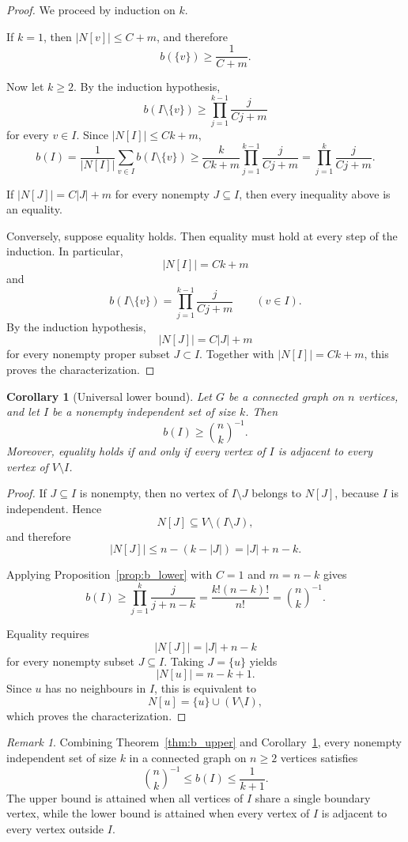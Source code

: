 \documentclass[11pt,a4paper]{article}
\numberwithin{equation}{section}
\theoremstyle{plain}
\newtheorem{corollary}[theorem]{Corollary}
\theoremstyle{definition}
\theoremstyle{remark}
\newtheorem{remark}[theorem]{Remark}
\begin{document}
\begin{proof}
We proceed by induction on \(k\).

If \(k=1\), then \(|N[v]|\le C+m\), and therefore
\[
b(\{v\})\ge \frac1{C+m}.
\]

Now let \(k\ge2\). By the induction hypothesis,
\[
b(I\setminus\{v\})
\ge
\prod_{j=1}^{k-1}
\frac{j}{Cj+m}
\]
for every \(v\in I\). Since \(|N[I]|\le Ck+m\),
\[
b(I)
=
\frac1{|N[I]|}
\sum_{v\in I} b(I\setminus\{v\})
\ge
\frac{k}{Ck+m}
\prod_{j=1}^{k-1}
\frac{j}{Cj+m}
=
\prod_{j=1}^{k}
\frac{j}{Cj+m}.
\]

If \(|N[J]|=C|J|+m\) for every nonempty \(J\subseteq I\), then every inequality above is an equality.

Conversely, suppose equality holds. Then equality must hold at every step of the induction. In particular,
\[
|N[I]|=Ck+m
\]
and
\[
b(I\setminus\{v\})
=
\prod_{j=1}^{k-1}
\frac{j}{Cj+m}
\qquad
(v\in I).
\]
By the induction hypothesis,
\[
|N[J]|=C|J|+m
\]
for every nonempty proper subset \(J\subset I\). Together with \(|N[I]|=Ck+m\), this proves the characterization.
\end{proof}

\begin{corollary}[Universal lower bound]
\label{cor:b_universal_lower}
Let \(G\) be a connected graph on \(n\) vertices, and let \(I\) be a nonempty independent set of size \(k\). Then
\[
b(I)\ge \binom{n}{k}^{-1}.
\]
Moreover, equality holds if and only if every vertex of \(I\) is adjacent to every vertex of \(V\setminus I\).
\end{corollary}

\begin{proof}
If \(J\subseteq I\) is nonempty, then no vertex of \(I\setminus J\) belongs to \(N[J]\), because \(I\) is independent. Hence
\[
N[J]\subseteq V\setminus (I\setminus J),
\]
and therefore
\[
|N[J]|
\le
n-(k-|J|)
=
|J|+n-k.
\]

Applying Proposition~\ref{prop:b_lower} with \(C=1\) and \(m=n-k\) gives
\[
b(I)
\ge
\prod_{j=1}^{k}
\frac{j}{j+n-k}
=
\frac{k!(n-k)!}{n!}
=
\binom{n}{k}^{-1}.
\]

Equality requires
\[
|N[J]|=|J|+n-k
\]
for every nonempty subset \(J\subseteq I\). Taking \(J=\{u\}\) yields
\[
|N[u]|=n-k+1.
\]
Since \(u\) has no neighbours in \(I\), this is equivalent to
\[
N[u]=\{u\}\cup(V\setminus I),
\]
which proves the characterization.
\end{proof}

\begin{remark}
\label{rem:two_sided_bounds}
Combining Theorem~\ref{thm:b_upper} and Corollary~\ref{cor:b_universal_lower}, every nonempty independent set of size \(k\) in a connected graph on \(n\ge2\) vertices satisfies
\[
\binom{n}{k}^{-1}
\le
b(I)
\le
\frac1{k+1}.
\]
The upper bound is attained when all vertices of \(I\) share a single boundary vertex, while the lower bound is attained when every vertex of \(I\) is adjacent to every vertex outside \(I\).
\end{remark}
\end{document}
